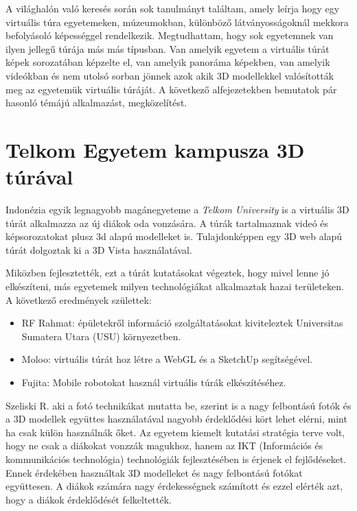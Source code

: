 A világhalón való keresés során sok tanulmányt találtam, amely leírja hogy egy virtuális túra egyetemeken, múzeumokban, különböző látványosságoknál mekkora befolyásoló képességgel rendelkezik. Megtudhattam, hogy sok egyetemnek van ilyen jellegű túrája más más típusban. Van amelyik egyetem a virtuális túrát képek sorozatában képzelte el, van amelyik panoráma képekben, van amelyik videókban és nem utolsó sorban jönnek azok akik 3D modellekkel valósították meg az egyetemük virtuális túráját. A következő alfejezetekben bemutatok pár hasonló témájú alkalmazást, megközelítést.

\section{Telkom Egyetem kampusza 3D túrával}

Indonézia egyik legnagyobb magánegyeteme a {\textit{Telkom University}\footnotemark} \cite{perdana2019implementation} is a virtuális 3D túrát alkalmazza az új diákok oda vonzására. A túrák tartalmaznak videó és képsorozatokat plusz 3d alapú modelleket is. Tulajdonképpen egy 3D web alapú túrát dolgoztak ki a 3D Vista használatával.


Miközben fejlesztették, ezt a túrát kutatásokat végeztek, hogy mivel lenne jó elkészíteni, más egyetemek milyen technológiákat alkalmaztak hazai területeken. A következő eredmények születtek: 
\begin{itemize}
	\item RF Rahmat: épületekről információ szolgáltatásokat kiviteleztek Universitas Sumatera Utara (USU) környezetben.
	\item Moloo: virtuális túrát hoz létre a WebGL és a SketchUp segítségével.
	\item Fujita: Mobile robotokat használ virtuális túrák elkészítéséhez.
\end{itemize}

Szeliski R. aki a fotó technikákat mutatta be, szerint is a nagy felbontású fotók és a 3D modellek együttes használatával nagyobb érdeklődési kört lehet elérni, mint ha csak külön használnák őket. 
Az egyetem kiemelt kutatási stratégia terve volt, hogy ne csak a diákokat vonzzák magukhoz, hanem az IKT (Információs és kommunikációs technológia) technológiák fejlesztésében is érjenek el fejlődéseket. Ennek érdekében használtak 3D modelleket és nagy felbontású fotókat együttesen. A diákok számára nagy érdekességnek számított és ezzel elérték azt, hogy a diákok érdeklődését felkeltették.

